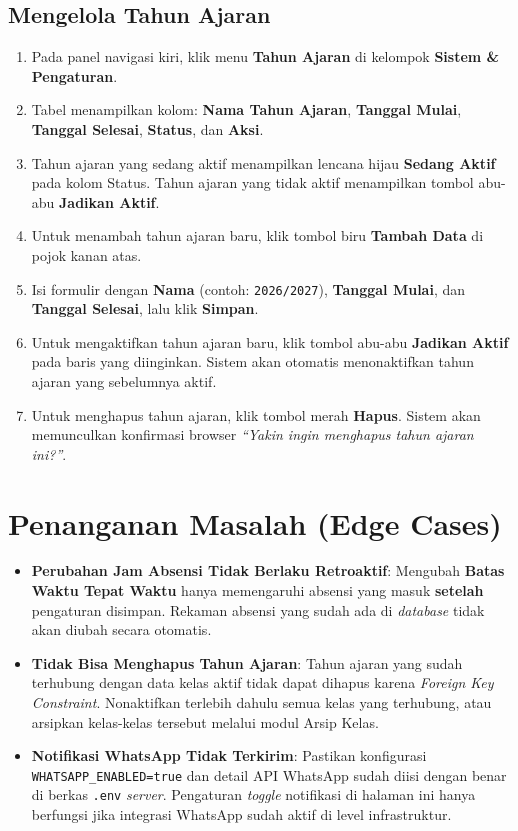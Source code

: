 \subsection{Mengelola Tahun Ajaran}
\begin{enumerate}
    \item Pada panel navigasi kiri, klik menu \textbf{Tahun Ajaran} di kelompok \textbf{Sistem \& Pengaturan}.
    \item Tabel menampilkan kolom: \textbf{Nama Tahun Ajaran}, \textbf{Tanggal Mulai}, \textbf{Tanggal Selesai}, \textbf{Status}, dan \textbf{Aksi}.
    \item Tahun ajaran yang sedang aktif menampilkan lencana hijau \textbf{Sedang Aktif} pada kolom Status. Tahun ajaran yang tidak aktif menampilkan tombol abu-abu \textbf{Jadikan Aktif}.
    \item Untuk menambah tahun ajaran baru, klik tombol biru \textbf{Tambah Data} di pojok kanan atas.
    \item Isi formulir dengan \textbf{Nama} (contoh: \texttt{2026/2027}), \textbf{Tanggal Mulai}, dan \textbf{Tanggal Selesai}, lalu klik \textbf{Simpan}.
    \item Untuk mengaktifkan tahun ajaran baru, klik tombol abu-abu \textbf{Jadikan Aktif} pada baris yang diinginkan. Sistem akan otomatis menonaktifkan tahun ajaran yang sebelumnya aktif.
    \item Untuk menghapus tahun ajaran, klik tombol merah \textbf{Hapus}. Sistem akan memunculkan konfirmasi browser \textit{``Yakin ingin menghapus tahun ajaran ini?''}.
\end{enumerate}

\section{Penanganan Masalah (Edge Cases)}
\begin{itemize}
    \item \textbf{Perubahan Jam Absensi Tidak Berlaku Retroaktif}: Mengubah \textbf{Batas Waktu Tepat Waktu} hanya memengaruhi absensi yang masuk \textbf{setelah} pengaturan disimpan. Rekaman absensi yang sudah ada di \textit{database} tidak akan diubah secara otomatis.
    \item \textbf{Tidak Bisa Menghapus Tahun Ajaran}: Tahun ajaran yang sudah terhubung dengan data kelas aktif tidak dapat dihapus karena \textit{Foreign Key Constraint}. Nonaktifkan terlebih dahulu semua kelas yang terhubung, atau arsipkan kelas-kelas tersebut melalui modul Arsip Kelas.
    \item \textbf{Notifikasi WhatsApp Tidak Terkirim}: Pastikan konfigurasi \texttt{WHATSAPP\_ENABLED=true} dan detail API WhatsApp sudah diisi dengan benar di berkas \texttt{.env} \textit{server}. Pengaturan \textit{toggle} notifikasi di halaman ini hanya berfungsi jika integrasi WhatsApp sudah aktif di level infrastruktur.
\end{itemize}
